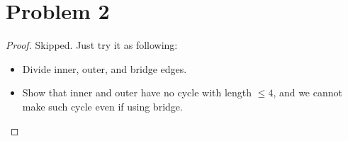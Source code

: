 \section*{Problem 2}
	\begin{proof}
		Skipped. Just try it as following:
		\begin{itemize}
			\item Divide inner, outer, and bridge edges.
			\item Show that inner and outer have no cycle with length $\leq 4$, and we cannot make such cycle even if using bridge.
		\end{itemize}
	\end{proof}